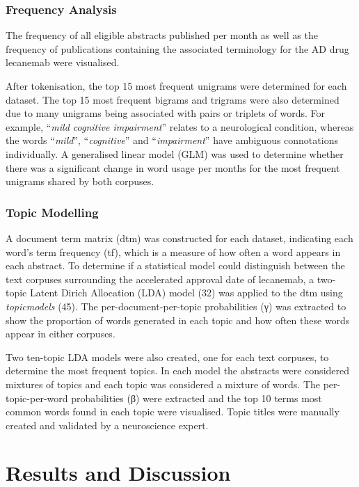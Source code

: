 \documentclass[
  a4paper,
]{article}
\begin{document}
\hypertarget{frequency-analysis}{%
\subsubsection{Frequency Analysis}\label{frequency-analysis}}

The frequency of all eligible abstracts published per month as well as
the frequency of publications containing the associated terminology for
the AD drug lecanemab were visualised.

After tokenisation, the top 15 most frequent unigrams were determined
for each dataset. The top 15 most frequent bigrams and trigrams were
also determined due to many unigrams being associated with pairs or
triplets of words. For example, ``\emph{mild cognitive impairment}''
relates to a neurological condition, whereas the words ``\emph{mild}'',
``\emph{cognitive}'' and ``\emph{impairment}'' have ambiguous
connotations individually. A generalised linear model (GLM) was used to
determine whether there was a significant change in word usage per
months for the most frequent unigrams shared by both corpuses.

\hypertarget{topic-modelling}{%
\subsubsection{Topic Modelling}\label{topic-modelling}}

A document term matrix (dtm) was constructed for each dataset,
indicating each word's term frequency (tf), which is a measure of how
often a word appears in each abstract. To determine if a statistical
model could distinguish between the text corpuses surrounding the
accelerated approval date of lecanemab, a two-topic Latent Dirich
Allocation (LDA) model (32) was applied to the dtm using
\emph{topicmodels} (45). The per-document-per-topic probabilities (γ)
was extracted to show the proportion of words generated in each topic
and how often these words appear in either corpuses.

Two ten-topic LDA models were also created, one for each text corpuses,
to determine the most frequent topics. In each model the abstracts were
considered mixtures of topics and each topic was considered a mixture of
words. The per-topic-per-word probabilities (β) were extracted and the
top 10 terms most common words found in each topic were visualised.
Topic titles were manually created and validated by a neuroscience
expert.

\hypertarget{results-and-discussion}{%
\section{Results and Discussion}\label{results-and-discussion}}
\end{document}
